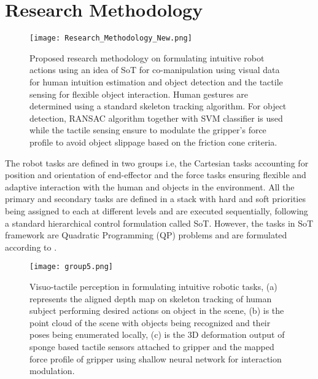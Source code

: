 \documentclass[letterpaper, 10 pt, conference]{ieeeconf}  %
\begin{document}
\section{Research Methodology}

   \begin{figure}[t]
      \centering
      \texttt{[image: Research\_Methodology\_New.png]}
      \caption{Proposed research methodology on formulating intuitive robot actions using an idea of SoT for co-manipulation using visual data for human intuition estimation and object detection and the tactile sensing for flexible object interaction. Human gestures are determined using a standard skeleton tracking algorithm. For object detection, RANSAC algorithm together with SVM classifier is used while the tactile sensing ensure to modulate the gripper's force profile to avoid object slippage based on the friction cone criteria.}
      \label{three}
      \vspace{-15pt}
   \end{figure}

The robot tasks are defined in two groups i.e, the Cartesian tasks accounting for position and orientation of end-effector and the force tasks ensuring flexible and adaptive interaction with the human and objects in the environment. All the primary and secondary tasks are defined in a stack with hard and soft priorities being assigned to each at different levels and are executed sequentially, following a standard hierarchical control formulation called SoT. However, the tasks in SoT framework are Quadratic Programming (QP) problems and are formulated according to \cite{c9}\cite{c10}.

   \begin{figure*}[h]
      \centering
      \texttt{[image: group5.png]}
      \caption{Visuo-tactile perception in formulating intuitive robotic tasks, (a) represents the aligned depth map on skeleton tracking of human subject performing desired actions on object in the scene, (b) is the point cloud of the scene with objects being recognized and their poses being enumerated locally, (c) is the 3D deformation output of sponge based tactile sensors attached to gripper and the mapped force profile of gripper using shallow neural network for interaction modulation.\\}
      \label{raw}
      \vspace{-15pt}
   \end{figure*}
\end{document}
